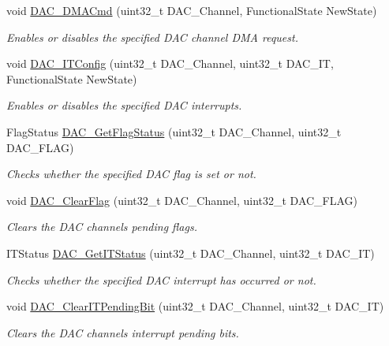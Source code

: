 \begin{DoxyCompactItemize}
void \hyperlink{group___d_a_c_ga194cba38f60ace11658824f0250121f4}{D\+A\+C\+\_\+\+D\+M\+A\+Cmd} (uint32\+\_\+t D\+A\+C\+\_\+\+Channel, Functional\+State New\+State)
\begin{DoxyCompactList}\small\item\em Enables or disables the specified D\+AC channel D\+MA request. \end{DoxyCompactList}\item 
void \hyperlink{group___d_a_c_ga12d7495b30eae40c2570118cabbda1c3}{D\+A\+C\+\_\+\+I\+T\+Config} (uint32\+\_\+t D\+A\+C\+\_\+\+Channel, uint32\+\_\+t D\+A\+C\+\_\+\+IT, Functional\+State New\+State)
\begin{DoxyCompactList}\small\item\em Enables or disables the specified D\+AC interrupts. \end{DoxyCompactList}\item 
Flag\+Status \hyperlink{group___d_a_c_ga9ee60b78f0ccd23bfbe54bce2a2f909b}{D\+A\+C\+\_\+\+Get\+Flag\+Status} (uint32\+\_\+t D\+A\+C\+\_\+\+Channel, uint32\+\_\+t D\+A\+C\+\_\+\+F\+L\+AG)
\begin{DoxyCompactList}\small\item\em Checks whether the specified D\+AC flag is set or not. \end{DoxyCompactList}\item 
void \hyperlink{group___d_a_c_ga49543c52786d70d6b6311f3fee856d37}{D\+A\+C\+\_\+\+Clear\+Flag} (uint32\+\_\+t D\+A\+C\+\_\+\+Channel, uint32\+\_\+t D\+A\+C\+\_\+\+F\+L\+AG)
\begin{DoxyCompactList}\small\item\em Clears the D\+AC channel\textquotesingle{}s pending flags. \end{DoxyCompactList}\item 
I\+T\+Status \hyperlink{group___d_a_c_ga541aac3b50db3a8a806ec5ef30679aca}{D\+A\+C\+\_\+\+Get\+I\+T\+Status} (uint32\+\_\+t D\+A\+C\+\_\+\+Channel, uint32\+\_\+t D\+A\+C\+\_\+\+IT)
\begin{DoxyCompactList}\small\item\em Checks whether the specified D\+AC interrupt has occurred or not. \end{DoxyCompactList}\item 
void \hyperlink{group___d_a_c_ga12d90e69a2642997136b23224d180641}{D\+A\+C\+\_\+\+Clear\+I\+T\+Pending\+Bit} (uint32\+\_\+t D\+A\+C\+\_\+\+Channel, uint32\+\_\+t D\+A\+C\+\_\+\+IT)
\begin{DoxyCompactList}\small\item\em Clears the D\+AC channel\textquotesingle{}s interrupt pending bits. \end{DoxyCompactList}\end{DoxyCompactItemize}


